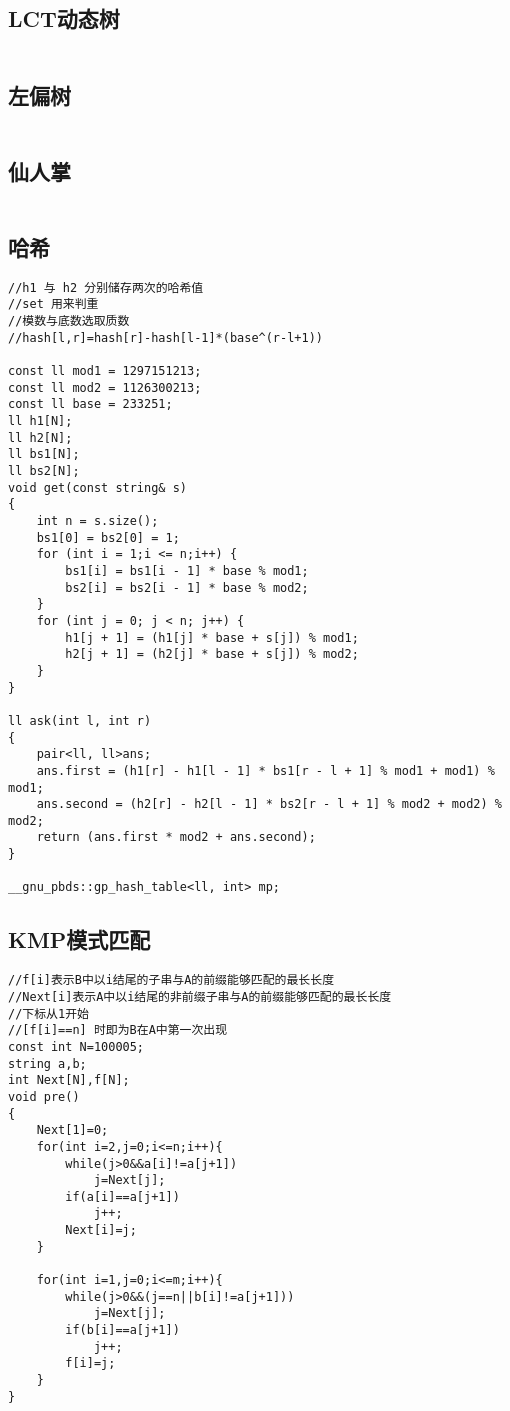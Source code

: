 \documentclass[twocolumn,a4]{article}
\begin{document}
\subsection{LCT动态树}
\begin{lstlisting}

\end{lstlisting}

\subsection{左偏树}
\begin{lstlisting}

\end{lstlisting}

\subsection{仙人掌}
\begin{lstlisting}

\end{lstlisting}

\subsection{哈希}
\begin{lstlisting}
//h1 与 h2 分别储存两次的哈希值
//set 用来判重
//模数与底数选取质数
//hash[l,r]=hash[r]-hash[l-1]*(base^(r-l+1))

const ll mod1 = 1297151213;
const ll mod2 = 1126300213;
const ll base = 233251;
ll h1[N];
ll h2[N];
ll bs1[N];
ll bs2[N];
void get(const string& s)
{
    int n = s.size();
    bs1[0] = bs2[0] = 1;
    for (int i = 1;i <= n;i++) {
        bs1[i] = bs1[i - 1] * base % mod1;
        bs2[i] = bs2[i - 1] * base % mod2;
    }
    for (int j = 0; j < n; j++) {
        h1[j + 1] = (h1[j] * base + s[j]) % mod1;
        h2[j + 1] = (h2[j] * base + s[j]) % mod2;
    }
}

ll ask(int l, int r)
{
    pair<ll, ll>ans;
    ans.first = (h1[r] - h1[l - 1] * bs1[r - l + 1] % mod1 + mod1) % mod1;
    ans.second = (h2[r] - h2[l - 1] * bs2[r - l + 1] % mod2 + mod2) % mod2;
    return (ans.first * mod2 + ans.second);
}

__gnu_pbds::gp_hash_table<ll, int> mp;
\end{lstlisting}

\subsection{KMP模式匹配}
\begin{lstlisting}
//f[i]表示B中以i结尾的子串与A的前缀能够匹配的最长长度
//Next[i]表示A中以i结尾的非前缀子串与A的前缀能够匹配的最长长度
//下标从1开始
//[f[i]==n] 时即为B在A中第一次出现
const int N=100005;
string a,b;
int Next[N],f[N];
void pre()
{
    Next[1]=0;
    for(int i=2,j=0;i<=n;i++){
        while(j>0&&a[i]!=a[j+1])
            j=Next[j];
        if(a[i]==a[j+1])
            j++;
        Next[i]=j;
    }

    for(int i=1,j=0;i<=m;i++){
        while(j>0&&(j==n||b[i]!=a[j+1]))
            j=Next[j];
        if(b[i]==a[j+1])
            j++;
        f[i]=j;
    }
}
\end{lstlisting}
\end{document}
